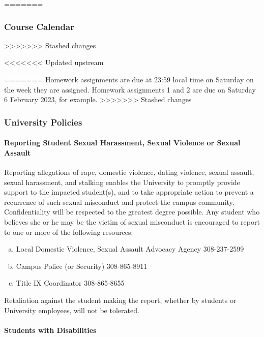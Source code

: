 \documentclass[12pt,fullpage]{article}
\newcounter{ex}\setcounter{ex}{0}
\newenvironment{alphalist}{
  \begin{enumerate}[(a)]
    \addtolength{\itemsep}{-0.5\itemsep}}
  {\end{enumerate}}
\newcommand{\ay}{2023}
\newcommand{\ay}{2023}
\begin{document}
=======
\subsubsection*{Course Calendar}
>>>>>>> Stashed changes


<<<<<<< Updated upstream

=======
Homework assignments are due at 23:59 local time on Saturday on the week they are assigned. Homework assignments 1 and 2 are due on Saturday 6 February \ay, for example.
>>>>>>> Stashed changes





\newpage




\subsubsection*{University Policies}



\paragraph{Reporting Student Sexual Harassment, Sexual Violence or Sexual Assault}

Reporting allegations of rape, domestic violence, dating violence, sexual assault, sexual harassment, 
and stalking enables the University to promptly provide support to the 
impacted student(s), and to take appropriate action to prevent a recurrence 
of such sexual misconduct and protect the campus community. Confidentiality 
will be respected to the greatest degree possible. Any student who believes 
she or he may be the victim of sexual misconduct is encouraged to report 
to one or more of the following resources:

\begin{alphalist}
    \item Local Domestic Violence, Sexual Assault Advocacy Agency 308-237-2599

    \item Campus Police (or Security) 308-865-8911

    \item  Title IX Coordinator 308-865-8655
\end{alphalist}

Retaliation against the student making the report, whether by students or University employees, will not be tolerated.


\paragraph{Students with Disabilities}
\end{document}
